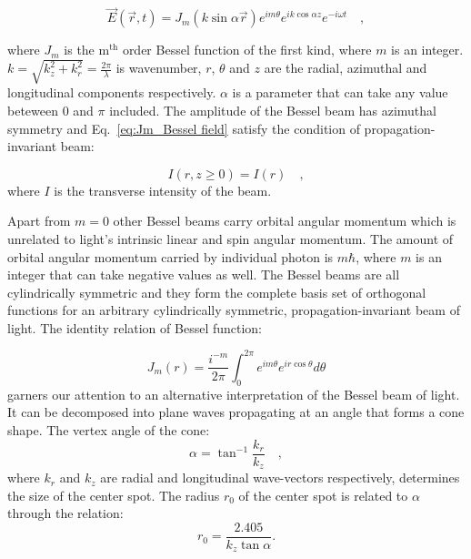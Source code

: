 \begin{equation}
\label{eq:Jm_Bessel field}
\vec{E}(\vec{r},t) = J_{m}(k \sin \alpha \vec{r})e^{im\theta}e^{ik\cos \alpha z}e^{-i\omega t} \quad ,
\end{equation}

where $J_m$ is the $\mathrm{m^{th}}$ order Bessel function of the first kind, where $m$ is an integer. $k = \sqrt{k^2_z + k^2_r} = \frac{2\pi}{\lambda}$ is  wavenumber, $r$, $\theta$ and $z$ are the radial, azimuthal and longitudinal components respectively. $\alpha$ is a parameter that can take any value beteween $0$ and $\pi$ included. The amplitude of the Bessel beam has azimuthal symmetry and Eq.~\eqref{eq:Jm_Bessel field} satisfy the condition of propagation-invariant beam:

\begin{equation}
\label{eq:propagation invariant condition}
I(r,z\geqslant 0) = I(r) \quad ,
\end{equation}
where $I$ is the transverse intensity of the beam.

 Apart from $m=0$ other Bessel beams carry orbital angular momentum which is unrelated to light's intrinsic linear and spin angular momentum. The amount of orbital angular momentum carried by individual photon is $m\hbar$, where $m$ is an integer that can take negative values as well. The Bessel beams are all cylindrically symmetric and they form the complete basis set of orthogonal functions for an arbitrary cylindrically symmetric, propagation-invariant beam of light. The identity relation of Bessel function:
 
 \begin{equation}
 \label{eq:Bessel Identity relation}
 J_m(r) = \frac{i^{-m}}{2\pi} \int _{0}^{2\pi}e^{im\theta}e^{ir\cos \theta }d\theta
 \end{equation}
garners our attention to an alternative interpretation of the Bessel beam of light. It can be decomposed into plane waves propagating at an angle that forms a cone shape. The vertex angle of the cone:
\begin{equation}
\label{eq:Bessel cone alpha}
\alpha = \tan ^{-1}\frac{k_r}{k_z}\quad ,
\end{equation}
where $k_r$ and $k_z$ are radial and longitudinal wave-vectors respectively, determines the size of the center spot. The radius $r_0$ \cite{mcgloin2005} of the center spot is related to $\alpha$ through the relation:
\begin{equation}
\label{eq:Bessel core spot size}
r_0 = \frac{2.405}{k_z \tan \alpha}.
\end{equation}


